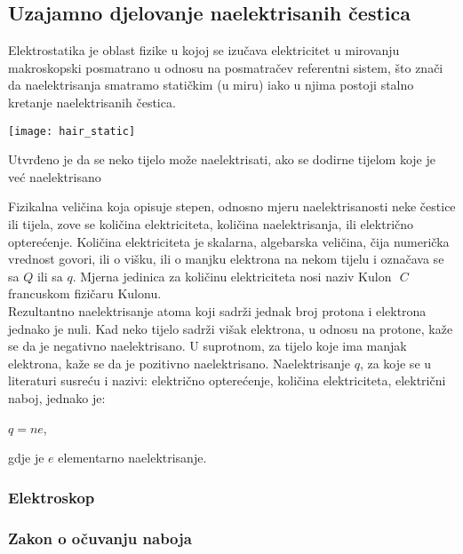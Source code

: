 
	\subsection{Uzajamno djelovanje naelektrisanih čestica}
	
	
	Elektrostatika je oblast fizike u kojoj se izučava elektricitet u mirovanju makroskopski posmatrano u odnosu na posmatračev referentni sistem, što znači da naelektrisanja smatramo statičkim (u miru) iako u njima postoji stalno kretanje naelektrisanih čestica.\\
	
	\begin{marginfigure}%
		\texttt{[image: hair\_static]}
		\caption{Utvrđeno je da se neko tijelo može naelektrisati, ako se dodirne tijelom koje je već naelektrisano}
		\label{fig:hair_static}
	\end{marginfigure} 
	Fizikalna veličina koja opisuje stepen, odnosno mjeru naelektrisanosti neke čestice ili  tijela, zove se količina elektriciteta, količina naelektrisanja, ili električno opterećenje. Količina elektriciteta je skalarna, algebarska veličina, čija numerička vrednost govori, ili o višku, ili o manjku elektrona na nekom tijelu i označava se sa $ Q $ ili sa $ q $. Mjerna jedinica za količinu elektriciteta nosi naziv Kulon $ \textit{ C } $ francuskom fizičaru Kulonu.\\
	
	
	
	Rezultantno naelektrisanje atoma koji sadrži jednak broj protona i elektrona jednako je nuli. Kad neko tijelo sadrži višak elektrona, u odnosu na protone, kaže se da je negativno naelektrisano. U suprotnom, za tijelo koje ima manjak elektrona, kaže se da je pozitivno naelektrisano. Naelektrisanje $ q $, za koje se u literaturi susreću i nazivi: električno opterećenje, količina elektriciteta, električni naboj, jednako je:
	
	
	\begin{center}
		$ q= n e$,
	\end{center} 
	gdje je $ e $ elementarno naelektrisanje.
	\subsubsection{Elektroskop}
	
	
	\subsubsection{Zakon o očuvanju naboja}
	
